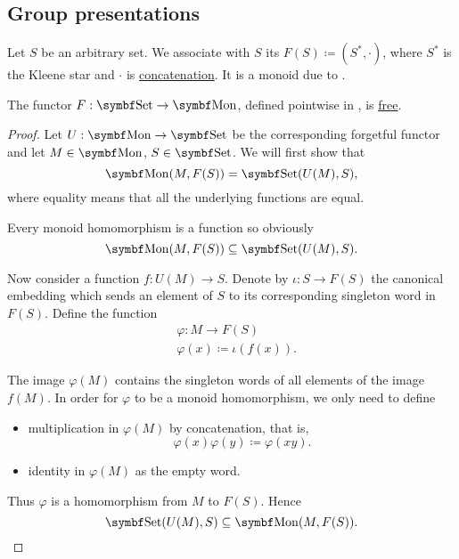 \subsection{Group presentations}\label{subsec:group_presentations}

\begin{definition}\label{def:free_monoid}\cite[306]{Knapp2016BAlg}
  Let \( S \) be an arbitrary set. We associate with \( S \) its  \( F(S) \coloneqq (S^{*}, \cdot) \), where \( S^{*} \) is the Kleene star and \( \cdot \) is \hyperref[def:language]{concatenation}. It is a monoid due to .
\end{definition}

\begin{proposition}\label{thm:free_monoid_is_free_functor}
  The functor \( F: \Cat{Set} \to \Cat{Mon} \), defined pointwise in , is \hyperref[def:free_functor]{free}.
\end{proposition}
\begin{proof}
  Let \( U: \Cat{Mon} \to \Cat{Set} \) be the corresponding forgetful functor and let \( M \in \Cat{Mon} \), \( S \in \Cat{Set} \). We will first show that
  \begin{equation*}
    \Cat{Mon}(M, F(S)) = \Cat{Set}(U(M), S),
  \end{equation*}
  where equality means that all the underlying functions are equal.

  Every monoid homomorphism is a function so obviously
  \begin{equation*}
    \Cat{Mon}(M, F(S)) \subseteq \Cat{Set}(U(M), S).
  \end{equation*}

  Now consider a function \( f: U(M) \to S \). Denote by \( \iota: S \to F(S) \) the canonical embedding which sends an element of \( S \) to its corresponding singleton word in \( F(S) \). Define the function
  \begin{align*}
    &\varphi: M \to F(S) \\
    &\varphi(x) \coloneqq \iota(f(x)).
  \end{align*}

  The image \( \varphi(M) \) contains the singleton words of all elements of the image \( f(M) \). In order for \( \varphi \) to be a monoid homomorphism, we only need to define
  \begin{itemize}
    \item multiplication in \( \varphi(M) \) by concatenation, that is,
    \begin{equation*}
      \varphi(x) \varphi(y) \coloneqq \varphi(xy).
    \end{equation*}

    \item identity in \( \varphi(M) \) as the empty word.
  \end{itemize}

  Thus \( \varphi \) is a homomorphism from \( M \) to \( F(S) \). Hence
  \begin{equation*}
    \Cat{Set}(U(M), S) \subseteq \Cat{Mon}(M, F(S)).
  \end{equation*}
\end{proof}

